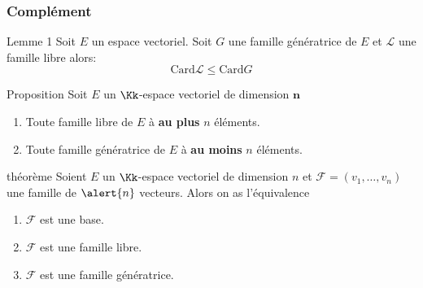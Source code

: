 \documentclass[dvipsnames]{beamer}
\begin{document}
\begin{frame}[<+->]
  \frametitle{Complément}
  \begin{block}{Lemme 1}
    \scriptsize
   Soit $E$ un espace vectoriel.  Soit $G$ une famille génératrice de $E$ et
   $\mathcal{L}$ une famille libre alors:
   \begin{equation}
     \text{Card} \mathcal{L} \leq \text{Card} G
   \end{equation}
  \end{block}
  
  \pause

  \begin{block}{Proposition}
    \scriptsize
    Soit $E$ un $\Kk$-espace vectoriel de dimension $\mathbf{n}$

    \begin{enumerate}
      \item Toute famille libre de $E$ à \textbf{\alert{au plus}} $n$
        éléments.\pause

      \item  Toute famille  génératrice de $E$ à \textbf{\alert{au
        moins}}  $n$ éléments.
    \end{enumerate}
  \end{block}
  \pause
  \begin{block}{théorème}
    \scriptsize
    Soient $E$ un $\Kk$-espace vectoriel de dimension $n$ et
    $\mathcal{F}=(v_1,\ldots, v_n) $ une famille de $\alert{n}$
    vecteurs. Alors on as l'équivalence 

    \begin{enumerate}
      \item $\mathcal{F}$ est une base.\\[4pt]
      \item $\mathcal{F}$ est une famille libre.\\[4pt]
      \item $\mathcal{F}$ est une famille génératrice.\\[4pt]
    \end{enumerate}
    
  \end{block}
\end{frame}
\end{document}
